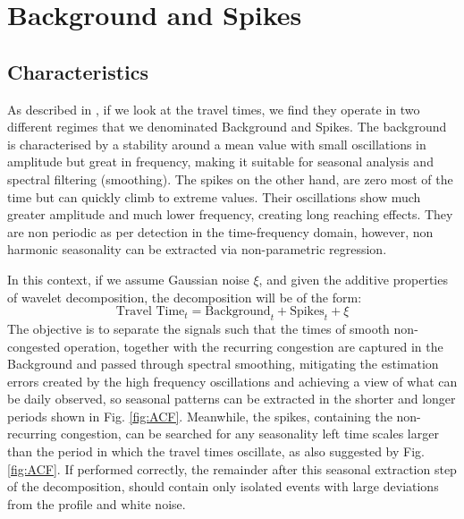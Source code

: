 \documentclass[a4paper, 10pt, conference]{ieeeconf}      %
\begin{document}
\section{Background and Spikes}
\subsection{Characteristics}
As described in \cite{ttprofiles}, if we look at the travel times, we find they operate in two different regimes that we denominated Background and Spikes.
The background is characterised by a stability around a mean value with small oscillations in amplitude but great in frequency, making it suitable for seasonal analysis and spectral filtering (smoothing).
The spikes on the other hand, are zero most of the time but can quickly climb to extreme values. Their oscillations show much greater amplitude and much lower frequency, creating long reaching effects. They are non periodic as per detection in the time-frequency domain, however, non harmonic seasonality can be extracted via non-parametric regression.

In this context, if we assume Gaussian noise $\xi$, and given the additive properties of wavelet decomposition, the decomposition will be of the form:
\begin{equation}
\textrm{Travel Time}_t  = \textrm{Background}_t + \textrm{Spikes}_t + \xi
\end{equation}
The objective is to separate the signals such that the times of smooth non-congested operation, together with the recurring congestion are captured in the Background and passed through spectral smoothing, mitigating the estimation errors created by the high frequency oscillations and achieving a view of what can be daily observed, so seasonal patterns can be extracted in the shorter and longer periods shown in Fig. \ref{fig:ACF}.
Meanwhile, the spikes, containing the non-recurring congestion, can be searched for any seasonality left time scales larger than the period in which the travel times oscillate, as also suggested by Fig. \ref{fig:ACF}. 
If performed correctly, the remainder after this seasonal extraction step of the decomposition, should contain only isolated events with large deviations from the profile and white noise.
\end{document}
